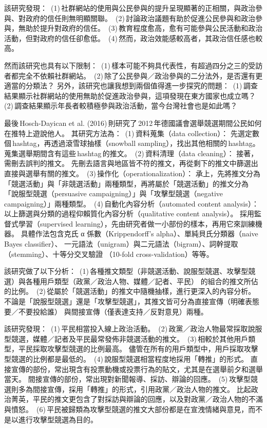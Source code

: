 \documentclass[letterpaper, 10pt, conference]{ieeeconf}   %
\begin{document}
\begin{CJK*}{UTF8}{bsmi}
該研究發現：
\,(1)\,社群網站的使用與公民參與的提升呈現顯著的正相關，與政治參與、對政府的信任則無明顯關聯。
\,(2)\,討論政治議題有助於促進公民參與和政治參與，無助於提升對政府的信任。
\,(3)\,教育程度愈高，愈有可能參與公民活動和政治活動，但對政府的信任卻愈低。
\,(4)\,然而，政治效能感較高者，其政治信任感也較高。

然而該研究也具有以下限制：
\,(1)\,樣本可能不夠具代表性，有超過四分之三的受訪者都完全不依賴社群網站。
\,(2)\,除了公民參與／政治參與的二分法外，是否還有更適當的分類法？
另外，該研究也讓我想到兩個值得進一步探究的問題：
\,(1)\,調查結果顯示社群網站的使用無助於促進政治參與，這項發現在東方國家也成立嗎？
\,(2)\,調查結果顯示年長者較積極參與政治活動，當今台灣社會也是如此嗎？

最後\,Hosch-Dayican et al. (2016)\,則研究了\,2012\,年德國議會選舉競選期間公民如何在推特上遊說他人。\cite{c3}
其研究方法為：
\,(1)\,資料蒐集（data collection）：
先選定數個\,hashtag，再透過滾雪球抽樣（snowball sampling），找出其他相關的\,hashtag。
蒐集選舉期間含有這些\,hashtag\,的推文。
\,(2)\,資料清理（data cleaning）：
接著，需刪去誤判的推文。
先刪去語言與地區皆不符的推文，再從剩下的推文中篩選出直接與選舉有關的推文。
\,(3)\,操作化（operationalization）：
承上，先將推文分為「競選活動」與「非競選活動」兩種類型，再將屬於「競選活動」的推文分為
「說服型競選（persuasive campaigning）」與「攻擊型競選（negative campaigning）」兩種類型。
\,(4)\,自動化內容分析（automated content analysis）：
以上篩選與分類的過程仰賴質化內容分析（qualitative content analysis）。
採用監督式學習（supervised learning），先由研究者做一小部份的樣本，再用它來訓練機器。
具體作法包含克氏 α 係數（Krippendorff's alpha）、單純貝氏分類器（naive Bayes classifier）、
一元語法（unigram）與二元語法（bigram）、詞幹提取（stemming）、十等分交叉驗證
（10-fold cross-validation）等等。

該研究做了以下分析：
\,(1)\,各種推文類型（非競選活動、說服型競選、攻擊型競選）與各種用戶類型（政黨／政治人物、媒體／記者、平民）
的組合的推文所佔的比例。
\,(2)\,從屬於「競選活動」的推文中隨機抽樣，進行更深入的內容分析。
不論是「說服型競選」還是「攻擊型競選」，其推文皆可分為直接宣傳（明確表態要／不要投給誰）
與間接宣傳（僅表達支持／反對意見）兩種。

該研究發現：
\,(1)\,平民相當投入線上政治活動。
\,(2)\,政黨／政治人物最常採取說服型競選，媒體／記者及平民最常發佈非競選活動的推文。
\,(3)\,相較於其他用戶類型，平民採取攻擊型競選的比例最高。
儘管在所有的用戶類型中，用戶採取攻擊型競選的比例都是最低的。
\,(4)\,說服型競選相當程度地採用「轉推」的形式。
直接宣傳的部份，常出現含有投票動機或投票行為的貼文，尤其是在選舉前夕和選舉當天。
間接宣傳的部份，常出現對新聞報導、採訪、辯論的回應。
\,(5)\,攻擊型競選則多為間接宣傳，採用「轉推」的形式，引用政黨／政治人物的推文。
比起政治菁英，平民的推文更包含了對採訪與辯論的回應，以及對政黨／政治人物的不滿與憤怒。
\,(6)\,平民被歸類為攻擊型競選的推文大部份都是在宣洩情緒與意見，而不是以進行攻擊型競選為目的。


\end{CJK*}
\end{document}
